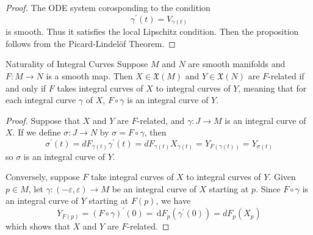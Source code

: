 \documentclass[../main.tex]{subfiles}
\begin{document}
\begin{proof}
    The ODE system corosponding to the condition \[
      \gamma ^{\prime} \left( t \right)= V_{ \gamma \left( t \right) } 
     \] is smooth. Thus it satisfies the local Lipschitz condition. Then the proposition follows from the Picard-Lindelöf Theorem. 
\end{proof}

\begin{proposition}{Naturality of Integral Curves}{}
Suppose $M$ and $N$ are smooth manifolds and $F:M\to N$ is a smooth map. Then $X\in\mathfrak{X}(M)$ and $Y\in\mathfrak{X}(N)$ are $F$-related if and only if $F$ takes integral curves of $X$ to integral curves of $Y$, meaning that for each integral curve $\gamma$ of $X$, $F\circ\gamma$ is an integral curve of $Y$.
\end{proposition}

\begin{proof}
    Suppose that  \(  X  \) and \(  Y  \) are \(  F  \)-related, and \(   \gamma :J\to M  \) is an integral curve of \(  X  \). If we define \(   \sigma: J\to  N  \) by \(   \sigma = F\circ  \gamma   \), then      \[
     \sigma ^{\prime} \left( t \right)=  d F_{ \gamma \left( t \right) } \gamma ^{\prime} \left( t \right)= d F_{ \gamma \left( t \right) } X_{ \gamma \left( t \right) }= Y_{F\left(  \gamma \left( t \right)  \right) }= Y_{ \sigma \left( t \right) }  
    \] so \(   \sigma   \) is an integral curve of \(  Y  \).  

    Conversely, suppose \(  F  \) take integral curves of \(  X  \) to integral curves of \(  Y  \). Given \(  p \in M  \), let \(   \gamma :\left( - \varepsilon , \varepsilon  \right)\to M   \) be an integral curve of \(  X  \) starting at \(  p  \). Since \(  F\circ  \gamma   \) is an integral curve of \(  Y  \) starting at \(  F\left( p \right)   \), we have \[
    Y_{F\left( p \right) }= \left( F\circ  \gamma  \right)^{\prime} \left( 0 \right)= \,\mathrm{d} F_{p}\left(  \gamma ^{\prime} \left( 0 \right)  \right)= d F_{p}\left( X_{p} \right)    
    \]          which shows that \(  X  \) and \(  Y  \) are \(  F  \)-related.   
\end{proof}
\end{document}

